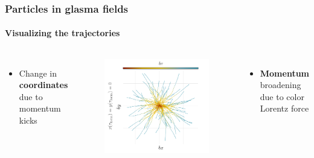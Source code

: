 \documentclass[aspectratio=169,11pt,usenames,dvipsnames]{beamer}
\begin{document}
\begin{frame}[noframenumbering]
    \frametitle{Particles in glasma fields}
    \framesubtitle{Visualizing the trajectories}
    \vspace{-0.5cm}
    \begin{columns}[onlytextwidth,t]
            \begin{itemize}\itemsep0em 
                \item \begin{center}\footnotesize Change in {\bfseries coordinates} due to momentum kicks\end{center}
            \end{itemize}
                \vspace{-20pt}
                \begin{figure}[!hbt]
                    \centering
                \includegraphics[width=1.1\columnwidth]{images/wong_coord.png}
                \end{figure}
            \begin{itemize}\itemsep0em 
                \item \begin{center}\footnotesize {\bfseries Momentum} broadening due to color Lorentz force\end{center}

\end{itemize}
\end{columns}
\end{frame}
\end{document}

